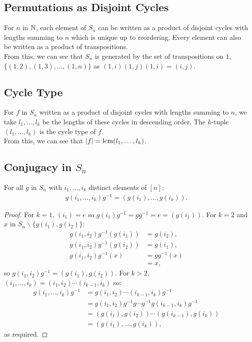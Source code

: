 \subsection{Permutations as Disjoint Cycles}

For $n$ in $\mathbb{N}$, each element of $S_n$ can be written as a product of
disjoint cycles with lengths summing to $n$ which is unique up to reordering.
Every element can also be written as a product of transpositions.
\\[\baselineskip]
From this, we can see that $S_n$ is generated by the set of transpositions on
$1$, $\{(1, 2), (1, 3), \ldots, (1, n)\}$ as $(1, i)(1, j)(1, i) = (i, j)$.

\subsection{Cycle Type}

For $f$ in $S_n$ written as a product of disjoint cycles with lengths summing
to $n$, we take $l_1, \ldots, l_k$ be the lengths of these cycles in
descending order. The $k$-tuple $(l_1, \ldots, l_k)$ is the cycle type of $f$.
\\[\baselineskip]
From this, we can see that $|f| = \operatorname{lcm}(l_1, \ldots, l_k)$.

\subsection{Conjugacy in $S_n$}

For all $g$ in $S_n$ with $i_1, \ldots, i_k$ distinct elements of $[n]$: 
\begin{align*}
    g(i_1, \ldots, i_k)g^{-1} = (g(i_1), \ldots, g(i_k)).
\end{align*}

\begin{proof}
    For $k = 1$, $(i_1) = e$ so $g(i_1)g^{-1} = gg^{-1} = e = (g(i_1))$.
    For $k = 2$ and $x$ in $S_n \backslash \{g(i_1), g(i_2)\}$: \begin{align*}
        g(i_1, i_2)g^{-1}(g(i_1)) 
        &= g(i_2), \\
        g(i_1, i_2)g^{-1}(g(i_2)) 
        &= g(i_1), \\
        g(i_1, i_2)g^{-1}(x) 
        &= gg^{-1}(x) \\
        &= x,
    \end{align*} so $g(i_1, i_2)g^{-1} = (g(i_1), g(i_2))$. For $k > 2$,
    $(i_1, \ldots, i_k) = (i_1, i_2)\cdots(i_{k - 1}, i_k)$ so: \begin{align*}
        g(i_1, \ldots, i_k)g^{-1} 
        &= g(i_1, i_2)\cdots(i_{k - 1}, i_k)g^{-1}\\
        &= g(i_1, i_2)g^{-1}g \cdots g^{-1}g(i_{k - 1}, i_k)g^{-1}\\
        &= (g(i_1), g(i_2)) \cdots (g(i_{k - 1}), g(i_k)) \\
        &= (g(i_1), \ldots, g(i_k)),
    \end{align*} as required.
\end{proof}

